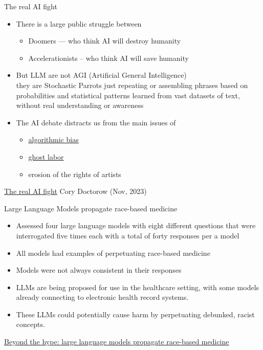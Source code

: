 \documentclass{beamer}
\begin{document}
\begin{frame}{The real AI fight}

\begin{itemize}
\item There is a large public struggle between
  \begin{itemize}
  \item Doomers --- who think AI will destroy humanity
  \item Accelerationists -- who think AI will save humanity
  \end{itemize}
\item But LLM are not AGI (Artificial General Intelligence)
  \\ they are Stochastic Parrots just repeating or assembling phrases based on probabilities and statistical patterns learned from vast datasets of text, without real understanding or awareness \citep{10.1145/3442188.3445922}
\item The AI debate distracts us from the main issues of
  \begin{itemize}
  \item \href{https://en.wikipedia.org/wiki/Algorithmic_bias}{algorithmic bias}
  \item \href{https://en.wikipedia.org/wiki/Ghost_work}{ghost labor}
  \item erosion of the rights of artists
  \end{itemize}
\end{itemize}
\href{https://pluralistic.net/2023/11/27/10-types-of-people/}{The real AI fight} Cory Doctorow (Nov, 2023)

\end{frame}

\begin{frame}{Large Language Models propagate race-based medicine}

\begin{itemize}
\item Assessed four large language models with eight different questions that were
interrogated five times each with a total of forty responses per a model
\item All models had examples
of perpetuating race-based medicine
\item Models were not always consistent in
their responses 
\item  LLMs are being proposed for use in the healthcare setting, with
some models already connecting to electronic health record systems. 
\item These LLMs could potentially cause harm by perpetuating debunked,
racist concepts. 
\end{itemize}
\href{https://doi.org/10.1101/2023.07.03.23292192}{Beyond the hype: large language models propagate race-based medicine }
\end{frame}
\end{document}

